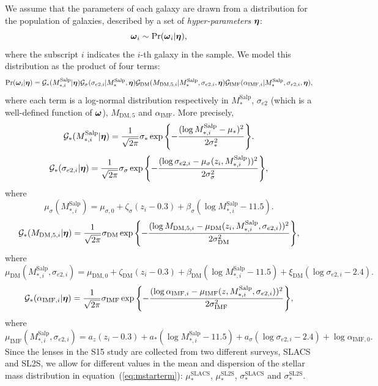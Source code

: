 \documentclass[usenatbib]{mnras}
\newcommand{\boldsymbol}[1]{\mbox{\boldmath{${#1}$}}}
\def\mdm{M_{\mathrm{DM}}}
\def\msalp{M_*^{\mathrm{Salp}}}
\def\aimf{\alpha_{\mathrm{IMF}}}
\def\mdm{M_{\mathrm{DM},5}}
\def\sigmaee{\sigma_{e2}}
\def\pr{{\rm Pr}}
\def\hyperp{\boldsymbol{\eta}}
\def\indpar{\boldsymbol{\omega}}
\def\indpari{\boldsymbol{\omega}_i}
\def\msalpi{M_{*,i}^{\mathrm{Salp}}}
\def\aimfi{\alpha_{\mathrm{IMF},i}}
\def\mdmi{M_{\mathrm{DM},5,i}}
\def\sigmaeei{\sigma_{e2,i}}
\def\Eref#1{equation~(\ref{#1})\xspace}
\begin{document}
We assume that the parameters of each galaxy are drawn from a
distribution for the population of galaxies, described by a set of
{\em hyper-parameters} $\hyperp$:
\begin{equation}
\indpari \sim \pr(\indpari | \hyperp),
\end{equation}
where the subscript $i$ indicates the $i$-th galaxy in the sample.
We model this distribution as the product of four terms:
\begin{equation}\label{eq:hyperp}
\pr(\indpari | \hyperp) = \mathcal{G}_*(\msalpi|\hyperp) \mathcal{G}_\sigma(\sigmaeei|\msalp, \hyperp) \mathcal{G}_{\mathrm{DM}}(\mdmi|\msalp,\sigmaeei,\hyperp) \mathcal{G}_{\mathrm{IMF}}(\aimfi|\msalp,\sigmaeei,\hyperp),
\end{equation}
where each term is a log-normal distribution respectively in $\msalp$, $\sigmaee$ (which is a well-defined function of $\indpar$), $\mdm$ and $\aimf$.
More precisely,
\begin{equation}\label{eq:mstarterm}
\mathcal{G}_*(\msalpi|\hyperp) = \frac{1}{\sqrt{2\pi}}{\sigma_*}\exp{\left\{-\frac{(\log{\msalpi} - \mu_*)^2}{2\sigma_*^2}\right\}}.
\end{equation}
%
\begin{equation}
\mathcal{G}_*(\sigmaeei|\hyperp) = \frac{1}{\sqrt{2\pi}}{\sigma_\sigma}\exp{\left\{-\frac{(\log{\sigmaeei} - \mu_\sigma(z_i, \msalpi))^2}{2\sigma_\sigma^2}\right\}},
\end{equation}
where
\begin{equation}
\mu_\sigma(\msalpi) = \mu_{\sigma,0} + \zeta_\sigma(z_i - 0.3) + \beta_\sigma(\log{\msalpi} - 11.5).
\end{equation}
%
\begin{equation}
\mathcal{G}_*(\mdmi|\hyperp) = \frac{1}{\sqrt{2\pi}}{\sigma_{\mathrm{DM}}}\exp{\left\{-\frac{(\log{\mdmi} - \mu_{\mathrm{DM}}(z_i, \msalpi, \sigmaeei))^2}{2\sigma_{\mathrm{DM}}^2}\right\}},
\end{equation}
where
\begin{equation}
\mu_{\mathrm{DM}}(\msalpi, \sigmaeei) = \mu_{\mathrm{DM},0} + \zeta_{\mathrm{DM}}(z_i - 0.3) + \beta_{\mathrm{DM}}(\log{\msalpi} - 11.5) + \xi_{\mathrm{DM}}(\log{\sigmaeei} - 2.4).
\end{equation}
%
\begin{equation}
\mathcal{G}_*(\aimfi|\hyperp) = \frac{1}{\sqrt{2\pi}}{\sigma_{\mathrm{IMF}}}\exp{\left\{-\frac{(\log{\aimfi} - \mu_{\mathrm{IMF}}(z, \msalpi, \sigmaeei))^2}{2\sigma_{\mathrm{IMF}}^2}\right\}},
\end{equation}
where
\begin{equation}
\mu_{\mathrm{IMF}}(\msalpi, \sigmaeei) = a_z(z_i - 0.3) + a_*(\log{\msalpi} - 11.5) + a_\sigma(\log{\sigmaeei} - 2.4) + \log{\alpha_{\mathrm{IMF},0}}.
\end{equation}
Since the lenses in the S15 study are collected from two different
surveys, SLACS and SL2S, we allow for different values in the mean and
dispersion of the stellar mass distribution in \Eref{eq:mstarterm}: $\mu_*^{\mathrm{SLACS}}$, $\mu_*^{\mathrm{SL2S}}$, $\sigma_*^{\mathrm{SLACS}}$ and $\sigma_*^{\mathrm{SL2S}}$.
\end{document}
